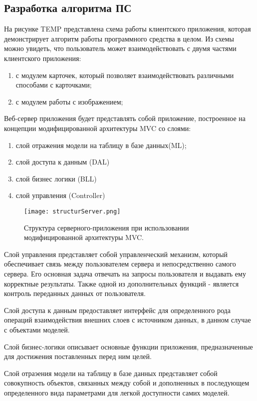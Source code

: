 \subsection{Разработка алгоритма ПС }
\label{sub:arch_and_mod:alholib}
На рисунке TEMP представлена схема работы клиентского приложения, которая демонстрирует алгоритм работы программного средства в целом. Из схемы можно увидеть, что пользователь может взаимодействовать с двумя частями клиентского приложения:

\begin{enumerate}
  \item с модулем карточек, который позволяет взаимодействовать различными способами с карточками;
  \item с модулем работы с изображением;
\end{enumerate}
Веб-сервер приложения будет представлять собой приложение, построенное на концепции модифицированной архитектуры MVC со слоями:
\begin{enumerate}
  \item слой отражения модели на таблицу в базе данных(ML);
  \item слой доступа к данным (DAL)
  \item слой бизнес логики (BLL)
  \item слой управления (Controller)
\end{enumerate}
\begin{figure}[ht]
\centering
  \texttt{[image: structurServer.png]}  
  \caption{ Структура серверного-приложения при использовании модифицированной архитектуры MVC. }
  \label{fig:domain:manual_structure:structural_server}
\end{figure}

Слой управления представляет собой управленческий механизм, который обеспечивает связь между пользователем сервера и непосредственно самого сервера. Его основная задача отвечать на запросы пользователя и выдавать ему корректные результаты. Также одной из дополнительных функций - является контроль переданных данных от пользователя.

Слой доступа к данным предоставляет интерфейс для определенного рода операций взаимодействия внешних слоев с источником данных, в данном случае с объектами моделей.

Слой бизнес-логики описывает основные функции приложения, предназначенные для достижения поставленных перед ним целей.

Слой отраэения модели на таблицу в базе данных представляет собой совокупность объектов, связанных между собой и дополненных в последующем определенного вида параметрами для легкой доступности самих моделей.

